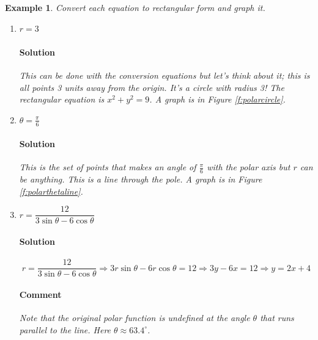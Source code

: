 \documentclass[letterpaper, 11pt, openany]{book}
\theoremstyle{mytheoremstyle}
\theoremstyle{myexamplestyle}
\newtheorem{example}{Example}[section]
\newenvironment{solution}{\paragraph{\sffamily \smaller \fontseries{b}\selectfont Solution}}{\hfill\faSquare}
\newenvironment{commentary}{\paragraph{\sffamily \smaller \fontseries{b}\selectfont Comment}}{}
\begin{document}
\begin{example}\label{e:polarconvs}
    Convert each equation to rectangular form and graph it.
    \begin{enumerate}
        \item $r = 3$\label{e:polarcircle}
        \begin{solution}
            This can be done with the conversion equations but let's think about it; this is all points 3 units away from the origin. It's a circle with radius 3! The rectangular equation is $x^{2} + y^{2} = 9$. A graph is in Figure \ref{f:polarcircle}.
        \end{solution}

        \item $\displaystyle \theta = \frac{\pi}{6}$\label{e:polarthetaline}
        \begin{solution}
            This is the set of points that makes an angle of $\frac{\pi}{6}$ with the polar axis but $r$ can be anything. This is a line through the pole. A graph is in Figure \ref{f:polarthetaline}.
        \end{solution}

        \item $r = \dfrac{12}{3\sin \theta - 6\cos \theta}$
        \begin{solution}
            \[r = \frac{12}{3\sin \theta - 6\cos \theta} \Rightarrow 3r \sin \theta - 6r \cos \theta = 12 \Rightarrow 3y - 6x = 12 \Rightarrow y = 2x + 4\]
            \begin{commentary}
                Note that the original polar function is undefined at the angle $\theta$ that runs parallel to the line. Here $\theta \approx 63.4^{\circ}$.
            \end{commentary}
        \end{solution}
    \end{enumerate}    
\end{example}
\end{document}
